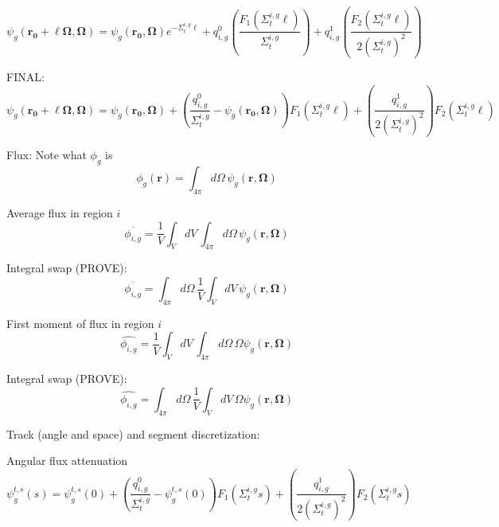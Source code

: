 \begin{dmath}
	\psi_g(\mathbf{r_0} + \ell \mathbf{\Omega},\mathbf{\Omega}) = \psi_g(\mathbf{r_0},\mathbf{\Omega}) e^{-\Sigma_{t}^{i,g} \ell} + q^0_{i,g} \left( \frac{F_1\left(\Sigma_{t}^{i,g} \ell\right)}{\Sigma_{t}^{i,g}} \right) + q^1_{i,g} \left(\frac{F_2\left(\Sigma_{t}^{i,g} \ell\right)}{2\left(\Sigma_{t}^{i,g}\right)^2}\right)
\end{dmath}


FINAL:
\begin{dmath}
	\psi_g(\mathbf{r_0} + \ell \mathbf{\Omega},\mathbf{\Omega}) = \psi_g(\mathbf{r_0},\mathbf{\Omega}) + \left( \frac{q^0_{i,g}}{\Sigma_{t}^{i,g}} - \psi_g(\mathbf{r_0},\mathbf{\Omega}) \right) F_1\left(\Sigma_{t}^{i,g} \ell\right) + \left(\frac{q^1_{i,g}}{2\left(\Sigma_{t}^{i,g}\right)^2}\right) F_2\left(\Sigma_{t}^{i,g} \ell\right)
\end{dmath}

Flux: Note what $\phi_g$ is
\begin{dmath}
	\phi_g(\mathbf{r}) = \int_{4\pi} d\Omega \, \psi_g(\mathbf{r},\mathbf{\Omega})
\end{dmath}

Average flux in region $i$
\begin{dmath}
	\overline{\phi_{i,g}} = \frac{1}{V}\int_V dV \, \int_{4\pi} d\Omega \, \psi_g(\mathbf{r},\mathbf{\Omega})
\end{dmath}

Integral swap (PROVE):
\begin{dmath}
	\overline{\phi_{i,g}} = \int_{4\pi} d\Omega \,  \frac{1}{V}\int_V dV \, \psi_g(\mathbf{r},\mathbf{\Omega})
\end{dmath}

First moment of flux in region $i$
\begin{dmath}
	\widehat{\phi_{i,g}} = \frac{1}{V}\int_V dV \, \int_{4\pi} d\Omega \, \Omega \psi_g(\mathbf{r},\mathbf{\Omega})
\end{dmath}

Integral swap (PROVE):
\begin{dmath}
	\widehat{\phi_{i,g}} = \int_{4\pi} d\Omega \, \frac{1}{V}\int_V dV \, \Omega \psi_g(\mathbf{r},\mathbf{\Omega})
\end{dmath}

Track (angle and space) and segment discretization:

Angular flux attenuation
\begin{dmath}
	\psi_g^{t,s}(s) = \psi^{t,s}_g(0) + \left( \frac{q^0_{i,g}}{\Sigma_{t}^{i,g}} - \psi_g^{t,s}(0) \right) F_1\left(\Sigma_{t}^{i,g} s \right) + \left(\frac{q^1_{i,g}}{2\left(\Sigma_{t}^{i,g}\right)^2}\right) F_2\left(\Sigma_{t}^{i,g} s \right)
\end{dmath}

